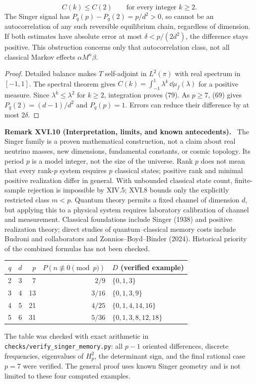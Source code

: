 \documentclass[11pt,a4paper,oneside]{book}
\newcommand{\statement}[3]{\par\medskip\noindent\textbf{#1 #2 (#3).}\ }
\begin{document}
\begin{equation}C(k)\le C(2)\qquad\text{for every integer }k\ge2.\tag{79}\end{equation}
The Singer signal has $P_q(p)-P_q(2)=p/d^2>0$, so cannot be an autocorrelation of any such reversible equilibrium chain, regardless of dimension. If both estimates have absolute error at most $\delta<p/(2d^2)$, the difference stays positive. This obstruction concerns only that autocorrelation class, not all classical Markov effects $\alpha M^n\beta$.
\begin{proof}Detailed balance makes $T$ self-adjoint in $L^2(\pi)$ with real spectrum in $[-1,1]$. The spectral theorem gives $C(k)=\int_{-1}^1\lambda^k\,\dd\mu_f(\lambda)$ for a positive measure. Since $\lambda^k\le\lambda^2$ for $k\ge2$, integration proves (79). As $p\ge7$, (69) gives $P_q(2)=(d-1)/d^2$ and $P_q(p)=1$. Errors can reduce their difference by at most $2\delta$.\end{proof}
\statement{Remark}{XVI.10}{Interpretation, limits, and known antecedents} The Singer family is a proven mathematical construction, not a claim about real neutrino masses, new dimensions, fundamental constants, or cosmic topology. Its period $p$ is a model integer, not the size of the universe. Rank $p$ does not mean that every rank-$p$ system requires $p$ classical states; positive rank and minimal positive realization differ in general. With unbounded classical state count, finite-sample rejection is impossible by XIV.5; XVI.8 bounds only the explicitly restricted class $m<p$. Quantum theory permits a fixed channel of dimension $d$, but applying this to a physical system requires laboratory calibration of channel and measurement. Classical foundations include Singer (1938) and positive realization theory; direct studies of quantum--classical memory costs include Budroni and collaborators and Zonnios--Boyd--Binder (2024). Historical priority of the combined formulas has not been checked.
\begin{center}\begin{tabular}{rrrrl}\toprule
$q$&$d$&$p$&$P(n\not\equiv0\pmod p)$&$D$ (verified example)\\\midrule
2&3&7&$2/9$&$\{0,1,3\}$\\3&4&13&$3/16$&$\{0,1,3,9\}$\\4&5&21&$4/25$&$\{0,1,4,14,16\}$\\5&6&31&$5/36$&$\{0,1,3,8,12,18\}$\\\bottomrule
\end{tabular}\end{center}
The table was checked with exact arithmetic in \texttt{checks/verify\_singer\_memory.py}: all $p-1$ oriented differences, discrete frequencies, eigenvalues of $H_p^2$, the determinant sign, and the final rational case $p=7$ were verified. The general proof uses known Singer geometry and is not limited to these four computed examples.
\setcounter{equation}{79}
\end{document}
